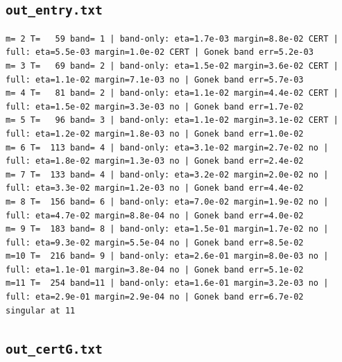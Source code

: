 \documentclass[11pt,reqno]{amsart}
\numberwithin{equation}{section}
\theoremstyle{plain}
\theoremstyle{definition}
\theoremstyle{remark}
\begin{document}
\subsection{\texttt{out\_entry.txt}}
\label{app:out-routeB-entry}

\begin{lstlisting}[style=out]
m= 2 T=   59 band= 1 | band-only: eta=1.7e-03 margin=8.8e-02 CERT | full: eta=5.5e-03 margin=1.0e-02 CERT | Gonek band err=5.2e-03
m= 3 T=   69 band= 2 | band-only: eta=1.5e-02 margin=3.6e-02 CERT | full: eta=1.1e-02 margin=7.1e-03 no | Gonek band err=5.7e-03
m= 4 T=   81 band= 2 | band-only: eta=1.1e-02 margin=4.4e-02 CERT | full: eta=1.5e-02 margin=3.3e-03 no | Gonek band err=1.7e-02
m= 5 T=   96 band= 3 | band-only: eta=1.1e-02 margin=3.1e-02 CERT | full: eta=1.2e-02 margin=1.8e-03 no | Gonek band err=1.0e-02
m= 6 T=  113 band= 4 | band-only: eta=3.1e-02 margin=2.7e-02 no | full: eta=1.8e-02 margin=1.3e-03 no | Gonek band err=2.4e-02
m= 7 T=  133 band= 4 | band-only: eta=3.2e-02 margin=2.0e-02 no | full: eta=3.3e-02 margin=1.2e-03 no | Gonek band err=4.4e-02
m= 8 T=  156 band= 6 | band-only: eta=7.0e-02 margin=1.9e-02 no | full: eta=4.7e-02 margin=8.8e-04 no | Gonek band err=4.0e-02
m= 9 T=  183 band= 8 | band-only: eta=1.5e-01 margin=1.7e-02 no | full: eta=9.3e-02 margin=5.5e-04 no | Gonek band err=8.5e-02
m=10 T=  216 band= 9 | band-only: eta=2.6e-01 margin=8.0e-03 no | full: eta=1.1e-01 margin=3.8e-04 no | Gonek band err=5.1e-02
m=11 T=  254 band=11 | band-only: eta=1.6e-01 margin=3.2e-03 no | full: eta=2.9e-01 margin=2.9e-04 no | Gonek band err=6.7e-02
singular at 11
\end{lstlisting}

\subsection{\texttt{out\_certG.txt}}
\label{app:out-routeB-certG}
\end{document}
